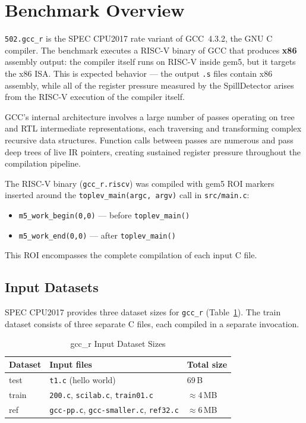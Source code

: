 \documentclass[conference]{IEEEtran}
\begin{document}
\section{Benchmark Overview}

\texttt{502.gcc\_r} is the SPEC CPU2017 rate variant of GCC~4.3.2,
the GNU C compiler. The benchmark executes a RISC-V binary of GCC
that produces \textbf{x86} assembly output: the compiler itself runs
on RISC-V inside gem5, but it targets the x86 ISA. This is expected
behavior --- the output \texttt{.s} files contain x86 assembly, while
all of the register pressure measured by the SpillDetector arises from
the RISC-V execution of the compiler itself.

GCC's internal architecture involves a large number of passes operating
on tree and RTL intermediate representations, each traversing and
transforming complex recursive data structures. Function calls between
passes are numerous and pass deep trees of live IR pointers, creating
sustained register pressure throughout the compilation pipeline.

The RISC-V binary (\texttt{gcc\_r.riscv}) was compiled with gem5
ROI markers inserted around the \texttt{toplev\_main(argc, argv)}
call in \texttt{src/main.c}:
\begin{itemize}
    \item \texttt{m5\_work\_begin(0,0)} --- before \texttt{toplev\_main()}
    \item \texttt{m5\_work\_end(0,0)}   --- after  \texttt{toplev\_main()}
\end{itemize}
This ROI encompasses the complete compilation of each input C file.

\subsection{Input Datasets}

SPEC CPU2017 provides three dataset sizes for \texttt{gcc\_r}
(Table~\ref{tab:inputs}). The train dataset consists of three
separate C files, each compiled in a separate invocation.

\begin{table}[H]
\centering
\caption{gcc\_r Input Dataset Sizes}
\label{tab:inputs}
\begin{tabular}{lll}
\toprule
\textbf{Dataset} & \textbf{Input files} & \textbf{Total size} \\
\midrule
test  & \texttt{t1.c} (hello world)  & 69\,B \\
train & \texttt{200.c}, \texttt{scilab.c}, \texttt{train01.c} & $\approx$4\,MB \\
ref   & \texttt{gcc-pp.c}, \texttt{gcc-smaller.c}, \texttt{ref32.c} & $\approx$6\,MB \\
\bottomrule
\end{tabular}
\end{table}
\end{document}
